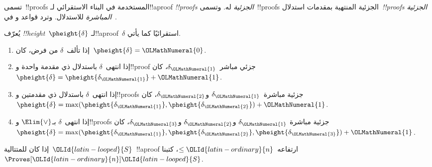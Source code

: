 \documentclass[../../../include/open-logic-section]{subfiles}
\begin{document}
تسمى~!!{proof}s المستخدمة في البناء الاستقرائي لـ!!a{proof}
\emph{!!{proof}s الجزئية} له. وتسمى~!!{proof}s الجزئية المنتهية بمقدمات
استدلال~\emph{!!{proof}s الجزئية المباشرة} للاستدلال. وترد قواعد
 و في~.



\begin{defn}
يُعرّف \emph{!!{height}}~$\pheight{\delta}$ لـ!!a{proof}~$\delta$
استقرائيًا كما يأتي.
\begin{enumerate}
  \item إذا تألف~$\delta$ من فرض، كان~$\pheight{\delta}={\OLMathNumeral{0}}$.
  \item إذا انتهى~$\delta$ باستدلال ذي مقدمة واحدة و!!{proof} جزئي
  مباشر~$\delta_{\OLMathNumeral{1}}$، كان~$\pheight{\delta}=\pheight{\delta_{\OLMathNumeral{1}}}+{\OLMathNumeral{1}}$.
  \item إذا انتهى~$\delta$ باستدلال ذي مقدمتين و!!{proof}s جزئية
  مباشرة~$\delta_{\OLMathNumeral{1}}$ و$\delta_{\OLMathNumeral{2}}$، كان~$\pheight{\delta}=
  \max(\pheight{\delta_{\OLMathNumeral{1}}},\pheight{\delta_{\OLMathNumeral{2}}})+{\OLMathNumeral{1}}$.
  \item إذا انتهى~$\delta$ بـ$\Elim{\lor}$ و!!{proof}s جزئية مباشرة
  $\delta_{\OLMathNumeral{1}}$ و$\delta_{\OLMathNumeral{2}}$ و$\delta_{\OLMathNumeral{3}}$، كان~$\pheight{\delta}=
  \max(\pheight{\delta_{\OLMathNumeral{1}}},\pheight{\delta_{\OLMathNumeral{2}}},\pheight{\delta_{\OLMathNumeral{3}}})+{\OLMathNumeral{1}}$.
\end{enumerate}
إذا كان للمتتالية~${\OLId{latin-looped}{S}}$~!!a{proof} ارتفاعه~$\le {\OLId{latin-ordinary}{n}}$، كتبنا~$\Proves[{\OLId{latin-ordinary}{n}}] {\OLId{latin-looped}{S}}$.
\end{defn}
\end{document}
